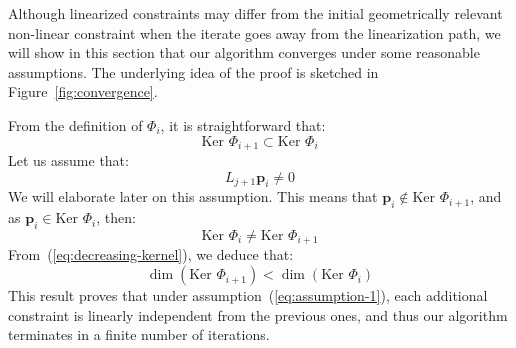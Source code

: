 \documentclass{tADR2e}
\newcommand\p{\mathbf{p}}
\newcommand\Jf{\Phi}
\newcommand\kernel{\mbox{Ker }}
\begin{document}
Although linearized constraints may differ from the initial geometrically relevant non-linear constraint when the iterate goes away from the linearization path, we will show in this section that  our algorithm converges under some reasonable assumptions. The underlying idea of the proof is sketched in Figure~\ref{fig:convergence}.

From the definition of $\Jf_{i}$, it is straightforward that:
\begin{equation}\label{eq:decreasing-kernel}
\kernel \Jf_{i+1} \subset \kernel \Jf_{i}
\end{equation}
Let us assume that:
\begin{equation}\label{eq:assumption-1}
L_{j+1}\p_i \not= 0
\end{equation}
We will elaborate later on this assumption. This means that 
$\p_{i}\notin\kernel \Jf_{i+1}$, and as $\p_{i}\in\kernel \Jf_{i}$, then:
$$
\kernel \Jf_i \not= \kernel \Jf_{i+1}
$$
From~(\ref{eq:decreasing-kernel}), we deduce that:
$$
\dim (\kernel \Jf_{i+1}) < \dim (\kernel \Jf_i)
$$
This result proves that under assumption~(\ref{eq:assumption-1}), each additional constraint is linearly independent from the 
previous ones, and thus our algorithm terminates in a finite number of iterations.
\end{document}
